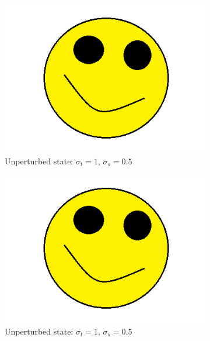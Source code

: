 \documentclass[12pt]{report}
\newcommand{\sigt}{\sigma_t}
\newcommand{\sigs}{\sigma_s}
\begin{document}
\begin{figure}[H]
\begin{subfigure}{.5\textwidth}
  \includegraphics[width=.98\linewidth]{figures/holder.png}
  \caption{Unperturbed state: $\sigt=1$, $\sigs=0.5$}
  \label{fig:sfig2}
\end{subfigure}%
\begin{subfigure}{.5\textwidth}
  \centering
  \includegraphics[width=.98\linewidth]{figures/holder.png}
  \caption{Unperturbed state: $\sigt=1$, $\sigs=0.5$}
  \label{fig:sfig5}
\end{subfigure}%
\\
\begin{subfigure}{.5\textwidth}
  \centering

\end{subfigure}
\end{figure}
\end{document}
